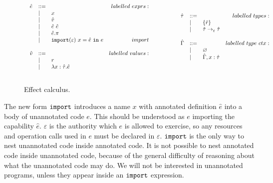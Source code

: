 \begin{figure}[h]
\vspace{-5pt}

\[
\begin{array}{lll}

\begin{array}{lllr}

\hat e & ::= & ~ & labelled~exprs: \\
	& | & x \\
	& | & \hat v \\
	& | & \hat e ~ \hat e \\
	& | & \hat e.\pi \\
	& | & \mathtt{import}(\varepsilon)~x = \hat e~\mathtt{in}~e & import \\
	&&\\

\hat v & ::= & ~ & labelled~values: \\
	& | & r \\
	& | & \lambda x: \hat \tau.\hat e \\
	&&\\

\end{array}

& ~~~~~~~~&

\begin{array}{lllr}

\hat \tau & ::= & ~ & labelled ~types: \\
		& | & \{ \bar r \} \\
		& | & \hat \tau \rightarrow_{\varepsilon} \hat \tau \\
		&&\\

\hat \Gamma & ::= & ~ & labelled~type~ctx:\\
				& | & \varnothing \\
				& | & \hat \Gamma, x: \hat \tau \\
				&&\\

\end{array}

\end{array}
\]

\vspace{-7pt}
\caption{Effect calculus.}
\label{fig:epscalc_annotated_grammar}
\end{figure}

The new form $\mathtt{import}$ introduces a name $x$ with annotated definition $\hat e$ into a body of unannotated code $e$. This should be understood as $e$ importing the capability $\hat e$. $\varepsilon$ is the authority which $e$ is allowed to exercise, so any resources and operation calls used in $e$ must be declared in $\varepsilon$. $\mathtt{import}$ is the only way to nest unannotated code inside annotated code. It is not possible to nest annotated code inside unannotated code, because of the general difficulty of reasoning about what the unannotated code may do. We will not be interested in unannotated programs, unless they appear inside an $\mathtt{import}$ expression.

